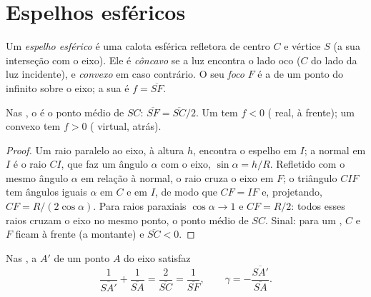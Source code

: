 \section{Espelhos esféricos}

\begin{definition}\label{def:b1:mirrors-thin-lenses:mirror}
Um \emph{espelho esférico} é uma calota esférica refletora de centro $C$
e vértice $S$ (a sua interseção com o eixo). Ele é \emph{côncavo}
se a luz encontra o lado oco ($C$ do lado da luz
incidente), e \emph{convexo} em caso contrário. O seu \emph{foco} $F$ é a  de um
ponto do infinito sobre o eixo; a sua  é $f = \overline{SF}$.
\end{definition}

\begin{proposition}\label{prop:b1:mirrors-thin-lenses:focus}
Nas , o  é o ponto médio de $SC$:
$\overline{SF} = \overline{SC}/2$. Um  tem $f < 0$ (
real, à frente); um convexo tem $f > 0$ ( virtual, atrás).
\end{proposition}

\begin{proof}
Um raio paralelo ao eixo, à altura $h$, encontra o espelho em $I$; a
normal em $I$ é o raio $CI$, que faz um ângulo $\alpha$ com o
eixo, $\sin\alpha = h/R$. Refletido com o mesmo ângulo $\alpha$ em relação à
normal, o raio cruza o eixo em $F$; o triângulo $CIF$ tem ângulos
iguais $\alpha$ em $C$ e em $I$, de modo que $CF = IF$ e, projetando,
$CF = R/(2\cos\alpha)$. Para raios paraxiais $\cos\alpha \to 1$ e
$CF = R/2$: todos esses raios cruzam o eixo no mesmo ponto, o
ponto médio de $SC$. Sinal: para um , $C$ e $F$ ficam à frente
(a montante) e $\overline{SC} < 0$.
\end{proof}

\begin{theorem}\label{thm:b1:mirrors-thin-lenses:mirrorconj}
Nas , a  $A'$ de um ponto $A$ do eixo
satisfaz
\[
\frac{1}{\overline{SA'}} + \frac{1}{\overline{SA}} = \frac{2}{\overline{SC}}
= \frac{1}{\overline{SF}},
\qquad
\gamma = -\frac{\overline{SA'}}{\overline{SA}} .
\]
\end{theorem}

